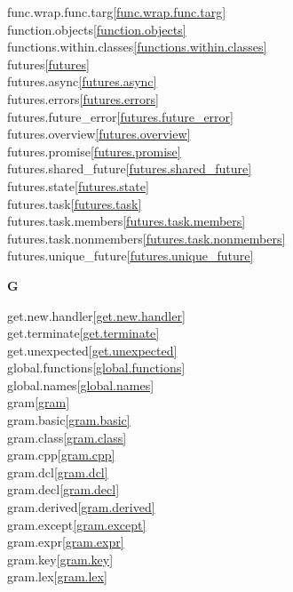 \begin{multicols}{2}
func.wrap.func.targ\quad\ref{func.wrap.func.targ}\\
function.objects\quad\ref{function.objects}\\
functions.within.classes\quad\ref{functions.within.classes}\\
futures\quad\ref{futures}\\
futures.async\quad\ref{futures.async}\\
futures.errors\quad\ref{futures.errors}\\
futures.future_error\quad\ref{futures.future_error}\\
futures.overview\quad\ref{futures.overview}\\
futures.promise\quad\ref{futures.promise}\\
futures.shared_future\quad\ref{futures.shared_future}\\
futures.state\quad\ref{futures.state}\\
futures.task\quad\ref{futures.task}\\
futures.task.members\quad\ref{futures.task.members}\\
futures.task.nonmembers\quad\ref{futures.task.nonmembers}\\
futures.unique_future\quad\ref{futures.unique_future}\\
\par \textbf{G}\par
get.new.handler\quad\ref{get.new.handler}\\
get.terminate\quad\ref{get.terminate}\\
get.unexpected\quad\ref{get.unexpected}\\
global.functions\quad\ref{global.functions}\\
global.names\quad\ref{global.names}\\
gram\quad\ref{gram}\\
gram.basic\quad\ref{gram.basic}\\
gram.class\quad\ref{gram.class}\\
gram.cpp\quad\ref{gram.cpp}\\
gram.dcl\quad\ref{gram.dcl}\\
gram.decl\quad\ref{gram.decl}\\
gram.derived\quad\ref{gram.derived}\\
gram.except\quad\ref{gram.except}\\
gram.expr\quad\ref{gram.expr}\\
gram.key\quad\ref{gram.key}\\
gram.lex\quad\ref{gram.lex}\\

\end{multicols}
